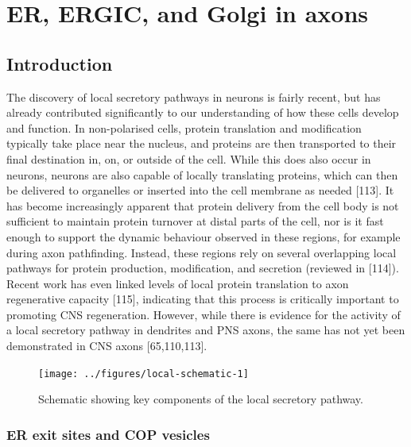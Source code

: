 \documentclass[
  12pt,
  a4paper,
]{book}
\renewcommand{\chaptermark}[1]{\markboth{#1}{}}
\begin{document}
\hypertarget{er-ergic-and-golgi-in-axons}{%
\chapter{ER, ERGIC, and Golgi in axons}\label{er-ergic-and-golgi-in-axons}}

\chaptermark{ER, ERGIC, and Golgi}

\hypertarget{introduction-2}{%
\section{Introduction}\label{introduction-2}}

The discovery of local secretory pathways in neurons is fairly recent, but has already contributed significantly to our understanding of how these cells develop and function. In non-polarised cells, protein translation and modification typically take place near the nucleus, and proteins are then transported to their final destination in, on, or outside of the cell. While this does also occur in neurons, neurons are also capable of locally translating proteins, which can then be delivered to organelles or inserted into the cell membrane as needed {[}113{]}. It has become increasingly apparent that protein delivery from the cell body is not sufficient to maintain protein turnover at distal parts of the cell, nor is it fast enough to support the dynamic behaviour observed in these regions, for example during axon pathfinding. Instead, these regions rely on several overlapping local pathways for protein production, modification, and secretion (reviewed in {[}114{]}). Recent work has even linked levels of local protein translation to axon regenerative capacity {[}115{]}, indicating that this process is critically important to promoting CNS regeneration. However, while there is evidence for the activity of a local secretory pathway in dendrites and PNS axons, the same has not yet been demonstrated in CNS axons {[}65,110,113{]}.

\begin{figure}
\texttt{[image: ../figures/local-schematic-1]} \caption[Schematic of the local secretory pathway]{Schematic showing key components of the local secretory pathway.}\label{fig:local-schematic}
\end{figure}

\hypertarget{er-exit-sites-and-cop-vesicles}{%
\subsection{ER exit sites and COP vesicles}\label{er-exit-sites-and-cop-vesicles}}
\end{document}
